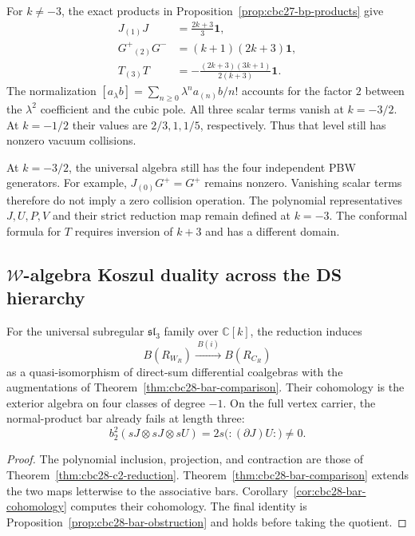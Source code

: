 \begin{computation}
\label{comp:bp-bar}
For $k\ne-3$, the exact products in Proposition~\ref{prop:cbc27-bp-products} give
\begin{align}
 J_{(1)}J&=\frac{2k+3}{3}\mathbf1,\label{eq:bp-curv-sl2}\\
 G^+{}_{(2)}G^-&=(k+1)(2k+3)\mathbf1,\label{eq:bp-curv-G}\\
 T_{(3)}T&=-\frac{(2k+3)(3k+1)}{2(k+3)}\mathbf1.
\end{align}
The normalization $[a_\lambda b]=\sum_{n\geq0}\lambda^na_{(n)}b/n!$
accounts for the factor $2$ between the $\lambda^2$ coefficient and the cubic pole.
All three scalar terms vanish at $k=-3/2$.
At $k=-1/2$ their values are $2/3,1,1/5$, respectively.
Thus that level still has nonzero vacuum collisions.

At $k=-3/2$, the universal algebra still has the four independent PBW generators.
For example, $J_{(0)}G^+=G^+$ remains nonzero.
Vanishing scalar terms therefore do not imply a zero collision operation.
The polynomial representatives $J,U,P,V$ and their strict reduction map remain defined at $k=-3$.
The conformal formula for $T$ requires inversion of $k+3$ and has a different domain.
\end{computation}


\subsection{$\mathcal{W}$-algebra Koszul duality across the DS hierarchy}
\label{sec:ds-hierarchy-koszul}

\begin{proposition}\label{prop:ds-koszul-hierarchy}
For the universal subregular $\mathfrak{sl}_3$ family over $\mathbb C[k]$, the reduction induces
\[
 B(R_{W_R})\xrightarrow{\ B(i)\ }B(R_{C_R})
\]
as a quasi-isomorphism of direct-sum differential coalgebras with the augmentations of Theorem~\ref{thm:cbc28-bar-comparison}.
Their cohomology is the exterior algebra on four classes of degree $-1$.
On the full vertex carrier, the normal-product bar already fails at length three:
\[
 b_2^2(sJ\otimes sJ\otimes sU)=2s\bigl(:(\partial J)U:\bigr)\ne0.
\]
\end{proposition}
\begin{proof}
The polynomial inclusion, projection, and contraction are those of Theorem~\ref{thm:cbc28-c2-reduction}.
Theorem~\ref{thm:cbc28-bar-comparison} extends the two maps letterwise to the associative bars.
Corollary~\ref{cor:cbc28-bar-cohomology} computes their cohomology.
The final identity is Proposition~\ref{prop:cbc28-bar-obstruction} and holds before taking the quotient.
\end{proof}

